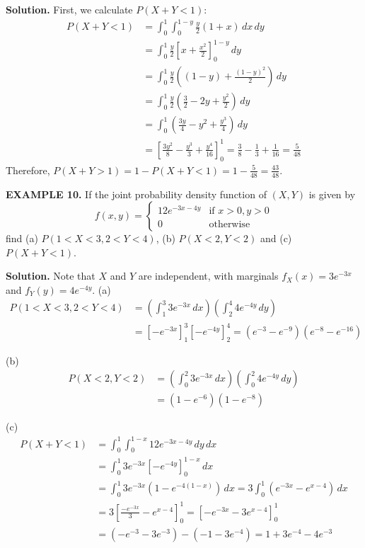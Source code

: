 \documentclass{article}
\begin{document}
\textbf{Solution.} First, we calculate $P(X+Y < 1)$:
\begin{align*}
P(X+Y < 1) &= \int_{0}^{1} \int_{0}^{1-y} \frac{y}{2}(1+x) \,dx \,dy \\
&= \int_{0}^{1} \frac{y}{2} \left[ x + \frac{x^2}{2} \right]_{0}^{1-y} \,dy \\
&= \int_{0}^{1} \frac{y}{2} \left( (1-y) + \frac{(1-y)^2}{2} \right) \,dy \\
&= \int_{0}^{1} \frac{y}{2} \left( \frac{3}{2} - 2y + \frac{y^2}{2} \right) \,dy \\
&= \int_{0}^{1} \left( \frac{3y}{4} - y^2 + \frac{y^3}{4} \right) \,dy \\
&= \left[ \frac{3y^2}{8} - \frac{y^3}{3} + \frac{y^4}{16} \right]_{0}^{1} = \frac{3}{8} - \frac{1}{3} + \frac{1}{16} = \frac{5}{48}
\end{align*}
Therefore, $P(X+Y > 1) = 1 - P(X+Y < 1) = 1 - \frac{5}{48} = \frac{43}{48}$.

\vspace{1em}

\textbf{EXAMPLE 10.} If the joint probability density function of $(X,Y)$ is given by
$$
f(x, y) = \begin{cases} 12e^{-3x-4y} & \text{if } x > 0, y > 0 \\ 0 & \text{otherwise} \end{cases}
$$
find (a) $P(1 < X < 3, 2 < Y < 4)$, (b) $P(X < 2, Y < 2)$ and (c) $P(X +Y < 1)$.

\textbf{Solution.} Note that $X$ and $Y$ are independent, with marginals $f_X(x) = 3e^{-3x}$ and $f_Y(y) = 4e^{-4y}$.
(a)
\begin{align*}
P(1 < X < 3, 2 < Y < 4) &= \left( \int_{1}^{3} 3e^{-3x} \,dx \right) \left( \int_{2}^{4} 4e^{-4y} \,dy \right) \\
&= \left[ -e^{-3x} \right]_{1}^{3} \left[ -e^{-4y} \right]_{2}^{4} = (e^{-3} - e^{-9})(e^{-8} - e^{-16})
\end{align*}

(b) 
\begin{align*}
P(X < 2, Y < 2) &= \left( \int_{0}^{2} 3e^{-3x} \,dx \right) \left( \int_{0}^{2} 4e^{-4y} \,dy \right) \\
&= (1 - e^{-6})(1 - e^{-8})
\end{align*}

(c)
\begin{align*}
P(X+Y < 1) &= \int_{0}^{1} \int_{0}^{1-x} 12e^{-3x-4y} \,dy \,dx \\
&= \int_{0}^{1} 3e^{-3x} \left[ -e^{-4y} \right]_{0}^{1-x} \,dx \\
&= \int_{0}^{1} 3e^{-3x} (1 - e^{-4(1-x)}) \,dx = 3 \int_{0}^{1} (e^{-3x} - e^{x-4}) \,dx \\
&= 3 \left[ \frac{-e^{-3x}}{3} - e^{x-4} \right]_{0}^{1} = \left[ -e^{-3x} - 3e^{x-4} \right]_{0}^{1} \\
&= (-e^{-3} - 3e^{-3}) - (-1 - 3e^{-4}) = 1 + 3e^{-4} - 4e^{-3}
\end{align*}
\end{document}
